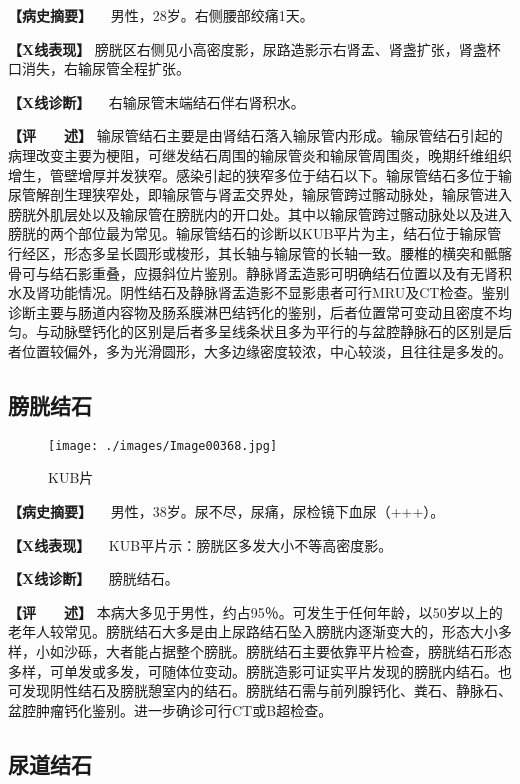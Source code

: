 \textbf{【病史摘要】} 　男性，28岁。右侧腰部绞痛1天。

\textbf{【X线表现】}
膀胱区右侧见小高密度影，尿路造影示右肾盂、肾盏扩张，肾盏杯口消失，右输尿管全程扩张。

\textbf{【X线诊断】} 　右输尿管末端结石伴右肾积水。

\textbf{【评　　述】}
输尿管结石主要是由肾结石落入输尿管内形成。输尿管结石引起的病理改变主要为梗阻，可继发结石周围的输尿管炎和输尿管周围炎，晚期纤维组织增生，管壁增厚并发狭窄。感染引起的狭窄多位于结石以下。输尿管结石多位于输尿管解剖生理狭窄处，即输尿管与肾盂交界处，输尿管跨过髂动脉处，输尿管进入膀胱外肌层处以及输尿管在膀胱内的开口处。其中以输尿管跨过髂动脉处以及进入膀胱的两个部位最为常见。输尿管结石的诊断以KUB平片为主，结石位于输尿管行经区，形态多呈长圆形或梭形，其长轴与输尿管的长轴一致。腰椎的横突和骶髂骨可与结石影重叠，应摄斜位片鉴别。静脉肾盂造影可明确结石位置以及有无肾积水及肾功能情况。阴性结石及静脉肾盂造影不显影患者可行MRU及CT检查。鉴别诊断主要与肠道内容物及肠系膜淋巴结钙化的鉴别，后者位置常可变动且密度不均匀。与动脉壁钙化的区别是后者多呈线条状且多为平行的与盆腔静脉石的区别是后者位置较偏外，多为光滑圆形，大多边缘密度较浓，中心较淡，且往往是多发的。

\subsection{膀胱结石}

\begin{figure}[!htbp]
    \centering
    \texttt{[image: ./images/Image00368.jpg]}
    \captionsetup{justification=centering}
    \caption{KUB片}
    \label{fig6-3-4}
\end{figure}

\textbf{【病史摘要】} 　男性，38岁。尿不尽，尿痛，尿检镜下血尿（+++）。

\textbf{【X线表现】} 　KUB平片示：膀胱区多发大小不等高密度影。

\textbf{【X线诊断】} 　膀胱结石。

\textbf{【评　　述】}
本病大多见于男性，约占95％。可发生于任何年龄，以50岁以上的老年人较常见。膀胱结石大多是由上尿路结石坠入膀胱内逐渐变大的，形态大小多样，小如沙砾，大者能占据整个膀胱。膀胱结石主要依靠平片检查，膀胱结石形态多样，可单发或多发，可随体位变动。膀胱造影可证实平片发现的膀胱内结石。也可发现阴性结石及膀胱憩室内的结石。膀胱结石需与前列腺钙化、粪石、静脉石、盆腔肿瘤钙化鉴别。进一步确诊可行CT或B超检查。

\subsection{尿道结石}

